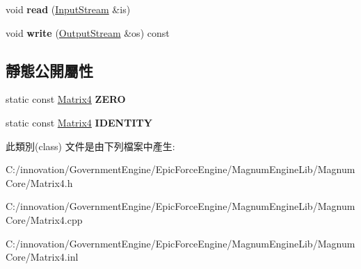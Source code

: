 \begin{DoxyCompactItemize}
\item 
void {\bfseries read} (\hyperlink{class_i_dream_sky_1_1_input_stream}{Input\+Stream} \&is)\hypertarget{class_i_dream_sky_1_1_matrix4_aa02a6219594ef7c2b74971de8e4443f6}{}\label{class_i_dream_sky_1_1_matrix4_aa02a6219594ef7c2b74971de8e4443f6}

\item 
void {\bfseries write} (\hyperlink{class_i_dream_sky_1_1_output_stream}{Output\+Stream} \&os) const \hypertarget{class_i_dream_sky_1_1_matrix4_ae08c1f9c8c00ea850fef62ecc57af955}{}\label{class_i_dream_sky_1_1_matrix4_ae08c1f9c8c00ea850fef62ecc57af955}

\end{DoxyCompactItemize}
\subsection*{靜態公開屬性}
\begin{DoxyCompactItemize}
\item 
static const \hyperlink{class_i_dream_sky_1_1_matrix4}{Matrix4} {\bfseries Z\+E\+RO}\hypertarget{class_i_dream_sky_1_1_matrix4_ab3067f8422c53a0d46ddd196f8eb0f1c}{}\label{class_i_dream_sky_1_1_matrix4_ab3067f8422c53a0d46ddd196f8eb0f1c}

\item 
static const \hyperlink{class_i_dream_sky_1_1_matrix4}{Matrix4} {\bfseries I\+D\+E\+N\+T\+I\+TY}\hypertarget{class_i_dream_sky_1_1_matrix4_af1a8bbab0eb73a6c499b16385ad6d75d}{}\label{class_i_dream_sky_1_1_matrix4_af1a8bbab0eb73a6c499b16385ad6d75d}

\end{DoxyCompactItemize}


此類別(class) 文件是由下列檔案中產生\+:\begin{DoxyCompactItemize}
\item 
C\+:/innovation/\+Government\+Engine/\+Epic\+Force\+Engine/\+Magnum\+Engine\+Lib/\+Magnum\+Core/Matrix4.\+h\item 
C\+:/innovation/\+Government\+Engine/\+Epic\+Force\+Engine/\+Magnum\+Engine\+Lib/\+Magnum\+Core/Matrix4.\+cpp\item 
C\+:/innovation/\+Government\+Engine/\+Epic\+Force\+Engine/\+Magnum\+Engine\+Lib/\+Magnum\+Core/Matrix4.\+inl\end{DoxyCompactItemize}
